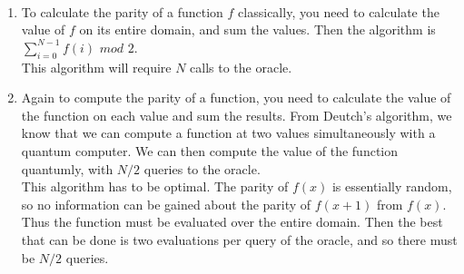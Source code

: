 \documentclass{assignment}
\begin{document}
\begin{problemlist}

  \pbitem
  \begin{problem}
  \end{problem}
  \begin{answer}
    \\
    \begin{enumerate}
    \item
      To calculate the parity of a function $f$ classically, you need to calculate the value of $f$ on its entire domain, and sum the values. Then the algorithm is $\sum_{i=0}^{N-1}f(i)$ $mod$ $2$.\\
      This algorithm will require $N$ calls to the oracle.
    \item
      Again to compute the parity of a function, you need to calculate the value of the function on each value and sum the results. From Deutch's algorithm, we know that we can compute a function at two values simultaneously with a quantum computer. We can then compute the value of the function quantumly, with $N/2$ queries to the oracle.\\
      This algorithm has to be optimal. The parity of $f(x)$ is essentially random, so no information can be gained about the parity of $f(x+1)$ from $f(x)$. Thus the function must be evaluated over the entire domain. Then the best that can be done is two evaluations per query of the oracle, and so there must be $N/2$ queries.\\
    \end{enumerate}
  \end{answer}


\end{problemlist}
\end{document}
